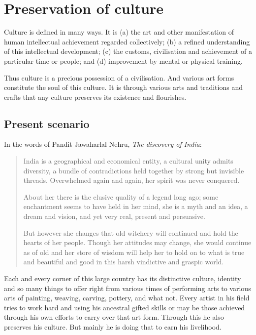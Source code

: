 \chapter{Preservation of culture} %
\label{cha:poc}

Culture is defined in many ways. It is (a) the art and other manifestation of human intellectual achievement regarded collectively; (b) a refined understanding of this intellectual development; (c) the customs, civilisation and achievement of a particular time or people; and (d) improvement by mental or physical training.

Thus culture is a precious possession of a civilisation. And various art forms constitute the soul of this culture. It is through various arts and traditions and crafts that any culture preserves its existence and flourishes.

\section{Present scenario} %
\label{sec:ps}

In the words of Pandit Jawaharlal Nehru, \emph{The discovery of India}:

\begin{quote}
  India is a geographical and economical entity, a cultural unity admits diversity, a bundle of contradictions held together by strong but invisible threads. Overwhelmed again and again, her spirit was never conquered.   

  About her there is the elusive quality of a legend long ago; some enchantment seems to have held in her mind, she is a myth and an idea, a dream and vision, and yet very real, present and persuasive.

  But however she changes that old witchery will continued and hold the hearts of her people. Though her attitudes may change, she would continue as of old and her store of wisdom will help her to hold on to what is true and beautiful and good in this harsh vindictive and graspic world.
\end{quote} 

Each and every corner of this large country has its distinctive culture, identity and so many things to offer right from various times of performing arts to various arts of painting, weaving, carving, pottery, and what not. Every artist in his field tries to work hard and using his ancestral gifted skills or may be those achieved through his own efforts to carry over that art form. Through this he also preserves his culture. But mainly he is doing that to earn his livelihood.

